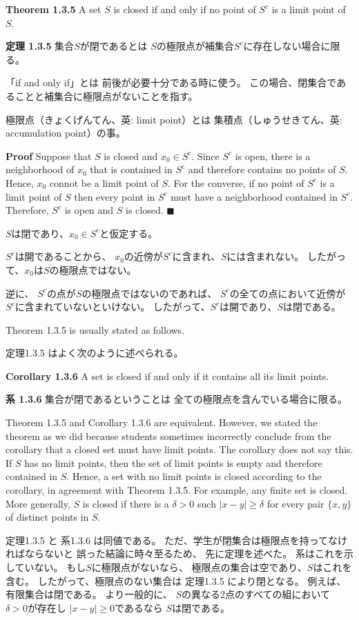 \documentclass[a5paper]{ltjarticle}
\begin{document}
\hrulefill

\textbf{Theorem 1.3.5}
A set $S$ is closed if and only if no point of $S^c$ is a limit point of $S$.

\dotfill

\textbf{定理 1.3.5}
集合$S$が閉であるとは
$S$の極限点が補集合$S^c$に存在しない場合に限る。

\dotfill

「if and only if」とは
前後が必要十分である時に使う。
この場合、閉集合であることと補集合に極限点がないことを指す。


極限点（きょくげんてん、英: limit point）とは
集積点（しゅうせきてん、英: accumulation point）の事。

\hrulefill


\textbf{Proof}
Suppose that $S$ is closed and $x_0\in S^c$.
Since $S^c$ is open, there is a neighborhood of $x_0$ that is contained in $S^c$
and therefore contains no points of $S$.
Hence, $x_0$ connot be a limit point of $S$.
For the converse, if no point of $S^c$ is a limit point of $S$
then every point in $S^c$ must have a neighborhood contained in $S^c$.
Therefore, $S^c$ is open and $S$ is closed.
$\blacksquare$

\dotfill

$S$は閉であり、$x_0\in S^c$と仮定する。

$S^c$は開であることから、
$x_0$の近傍が$S^c$に含まれ、$S$には含まれない。
したがって、$x_0$は$S$の極限点ではない。

逆に、
$S^c$の点が$S$の極限点ではないのであれば、
$S^c$の全ての点において近傍が$S^c$に含まれていないといけない。
したがって、$S^c$は開であり、$S$は閉である。

\hrulefill

Theorem 1.3.5 is usually stated as follows.

\dotfill

定理1.3.5 はよく次のように述べられる。

\hrulefill

\textbf{Corollary 1.3.6}
A set is closed if and only if it contains all its limit points.

\dotfill

\textbf{系 1.3.6}
集合が閉であるということは
全ての極限点を含んでいる場合に限る。

\hrulefill

Theorem 1.3.5 and Corollary 1.3.6 are equivalent.
However, we stated the theorem as we did because students sometimes incorrectly conclude
 from the corollary that a closed set must have limit points.
The corollary does not say this.
If $S$ has no limit points,
then the set of limit points is empty and therefore contained in $S$.
Hence, a set with no limit points is closed according to the corollary,
in agreement with Theorem 1.3.5.
For example, any finite set is closed.
More generally, $S$ is closed if there is a $\delta>0$ such $| x-y | \geq \delta$
for every pair $\{x,y\}$ of distinct points in $S$.

\dotfill

定理1.3.5 と 系1.3.6 は同値である。
ただ、学生が閉集合は極限点を持ってなければならないと
誤った結論に時々至るため、
先に定理を述べた。
系はこれを示していない。
もし$S$に極限点がないなら、
極限点の集合は空であり、$S$はこれを含む。
したがって、極限点のない集合は
定理1.3.5 により閉となる。
例えば、有限集合は閉である。
より一般的に、
$S$の異なる2点のすべての組において
$\delta>0$が存在し
$|x-y|\geq 0$であるなら
$S$は閉である。
\end{document}
